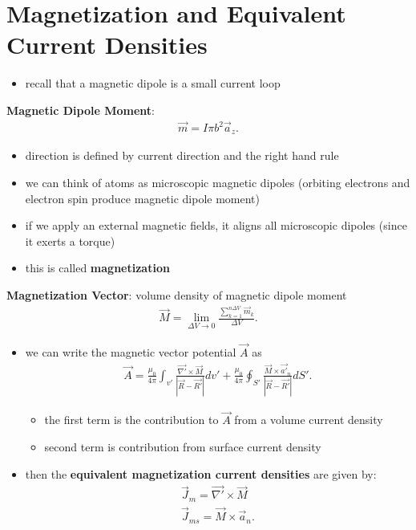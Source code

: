\documentclass[10pt]{article}
\begin{document}
\section{Magnetization and Equivalent Current Densities}
\begin{itemize}
    \item recall that a magnetic dipole is a small current loop
\end{itemize}
\begin{definition}
    \textbf{Magnetic Dipole Moment}:
    \begin{gather*}
        \vec{m} = I\pi b^2 \vec{a}_z 
    .\end{gather*}
    \begin{itemize}
        \item direction is defined by current direction and the right hand rule
    \end{itemize}
\end{definition}
\begin{itemize}
    \item we can think of atoms as microscopic magnetic dipoles (orbiting electrons and electron spin produce magnetic dipole moment)
    \item if we apply an external magnetic fields, it aligns all microscopic dipoles (since it exerts a torque)
    \item this is called \textbf{magnetization} 
\end{itemize}
\begin{definition}
    \textbf{Magnetization Vector}: volume density of magnetic dipole moment
    \begin{gather*}
        \vec{M} = \lim_{\Delta V \to 0} \frac{\sum_{k=1}^{n\Delta V} \vec{m}_k}{\Delta V}
    .\end{gather*}
\end{definition}
\begin{itemize}
    \item we can write the magnetic vector potential $\vec{A} $ as
        \begin{gather*}
            \vec{A} = \frac{\mu_0}{4\pi} \int_{v'} \frac{\vec{\nabla' } \times \vec{M}}{|\vec{R} - \vec{R'}|} dv' + \frac{\mu_0}{4\pi} \oint_{S'} \frac{\vec{M} \times \vec{a'}_n}{|\vec{R} - \vec{R'}|} dS' 
        .\end{gather*}
        \begin{itemize}
            \item the first term is the contribution to $\vec{A} $ from a volume current density 
            \item second term is contribution from surface current density
        \end{itemize}
    \item then the \textbf{equivalent magnetization current densities} are given by: 
        \begin{gather*}
            \vec{J}_m = \vec{\nabla '} \times \vec{M} \\ 
            \vec{J}_{ms} = \vec{M} \times \vec{a}_n
        .\end{gather*}
\end{itemize}
\end{document}

